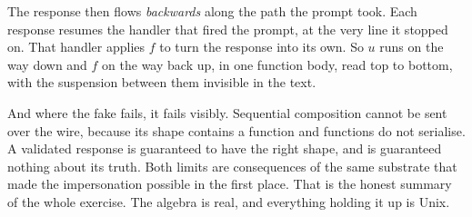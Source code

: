 \documentclass[11pt,a4paper]{article}
\begin{document}
The response then flows \emph{backwards} along the path the prompt took. Each response resumes the
handler that fired the prompt, at the very line it stopped on. That handler applies $f$ to turn the
response into its own. So $u$ runs on the way down and $f$ on the way back up, in one function body,
read top to bottom, with the suspension between them invisible in the text.

And where the fake fails, it fails visibly. Sequential composition cannot be sent over the wire,
because its shape contains a function and functions do not serialise. A validated response is
guaranteed to have the right shape, and is guaranteed nothing about its truth. Both limits are
consequences of the same substrate that made the impersonation possible in the first place. That is
the honest summary of the whole exercise. The algebra is real, and everything holding it up is
Unix.
\end{document}
